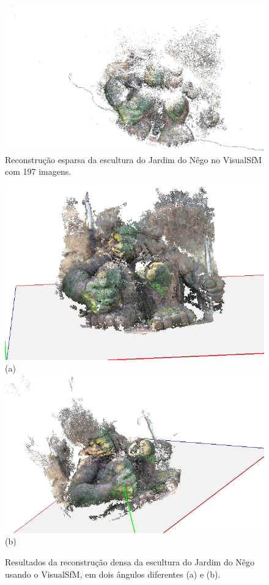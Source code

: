 \begin{figure}[!h]
	\centering
	\includegraphics[width=0.9\linewidth]{figs/guerreiroEsparsa.jpg}
	\caption{%
	Reconstrução esparsa da escultura do Jardim do Nêgo no VisualSfM com 197 imagens.
	}\label{fig:reconstrucaoEsparsaIndioVisualSFM}
\end{figure}

\begin{figure}[!h]
	\centering
	\includegraphics[width=0.40\linewidth]{figs/guerreirovisualsfmdmr.jpg}(a)
	\includegraphics[width=0.50\linewidth]{figs/guerreirovisualsfmdmr2.jpg}(b)
	\caption{%
	Resultados da reconstrução densa da escultura do Jardim do Nêgo usando o VisualSfM, em dois ângulos diferentes (a) e (b).
	}\label{fig:reconstrucaoDensaIndioVisualSFM}
\end{figure}



